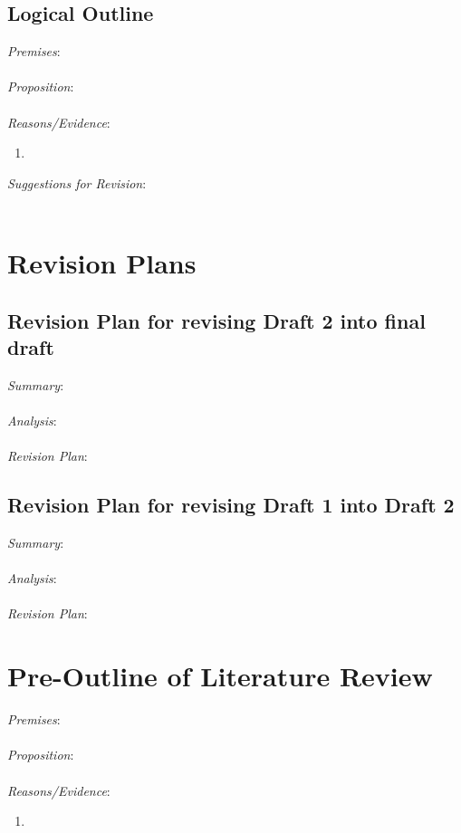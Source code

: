 \documentclass[12pt]{article}
\begin{document}
\subsection*{Logical Outline}
\noindent \textit{Premises}: \\ \\
\textit{Proposition}: \\ \\
\textit{Reasons/Evidence}:
\begin{enumerate}
	\item \ %
\end{enumerate}
\textit{Suggestions for Revision}: \\\\

\newpage
\section{Revision Plans}
\subsection{Revision Plan for revising Draft 2 into final draft}
\noindent \textit{Summary}:  \\ \\
\textit{Analysis}: \\ \\
\textit{Revision Plan}:

\subsection{Revision Plan for revising Draft 1 into Draft 2}
\noindent \textit{Summary}: \\ \\
\textit{Analysis}: \\ \\
\textit{Revision Plan}: 

















\newpage
\section{Pre-Outline of Literature Review}
\noindent \textit{Premises}: \\ \\
\textit{Proposition}: \\ \\
\textit{Reasons/Evidence}:
\begin{enumerate}
	\item 
\end{enumerate}
\end{document}
